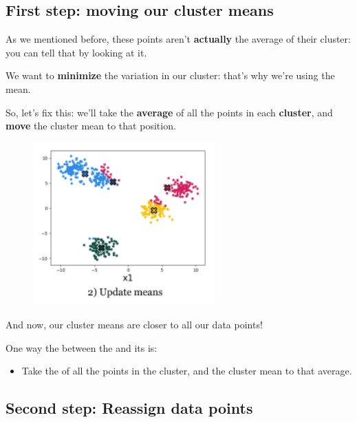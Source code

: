     \subsection{First step: moving our cluster means}
    
        As we mentioned before, these points aren't \textbf{actually} the average of their cluster: you can tell that by looking at it.
        
        We want to \textbf{minimize} the variation in our cluster: that's why we're using the mean.
        
        So, let's fix this: we'll take the \textbf{average} of all the points in each \textbf{cluster}, and \textbf{move} the cluster mean to that position.
        
        \begin{figure}[H]
            \centering
            \includegraphics[width=70mm,scale=0.4]{images/clustering_images/update_means_clustering.png}
        \end{figure}
        
        And now, our cluster means are closer to all our data points!\\
        
        \begin{concept}
            One way  the  between the  and its  is:
            
            \begin{itemize}
                \item Take the  of all the points in the cluster, and  the cluster mean to that average.
            \end{itemize} 
        \end{concept}
        
    \subsection{Second step: Reassign data points}
    
